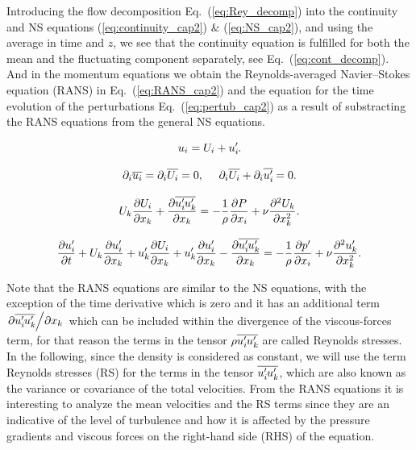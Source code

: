 Introducing the flow decomposition Eq.~(\ref{eq:Rey_decomp}) into the continuity and NS equations (\ref{eq:continuity_cap2}) $\&$ (\ref{eq:NS_cap2}), and using the average in time and $z$, we see that the continuity equation is fulfilled for both the mean and the fluctuating component separately, see Eq.~(\ref{eq:cont_decomp}). And in the momentum equations we obtain the Reynolds-averaged Navier--Stokes equation (RANS) in Eq.~(\ref{eq:RANS_cap2}) and the equation for the time evolution of the perturbations Eq.~(\ref{eq:pertub_cap2}) as a result of substracting the RANS equations from the general NS equations.

\begin{equation}
    \label{eq:Rey_decomp}
    u_i = U_i + u_i^{\prime}\mkern-1.2mu.
\end{equation}

\begin{equation}
    \label{eq:cont_decomp}
    \partial_i \overline{u_i} = \partial_i \overline{U_i} = 0 ,~~~~
    \partial_i \overline{U_i} + \partial_i \overline{u_i^{\prime}\mkern-1.2mu} = 0.  
\end{equation}

\begin{equation}
    \label{eq:RANS_cap2}
    U_k\pdv{U_i}{x_k} + \pdv{\overline{u_i^{\prime}\mkern-1.2muu_k^{\prime}\mkern-1.2mu}}{x_k} = -\frac {1} {\rho} \frac {\partial P}{\partial x_i} + \nu  \frac {\partial^2 U_k} {\partial x_k^2}.
\end{equation}

\begin{equation}
    \label{eq:pertub_cap2}
    {\pdv{u_i^{\prime}\mkern-1.2mu}{t} + 
    U_k\pdv{u_i^{\prime}\mkern-1.2mu}{x_k} + u_k^{\prime}\mkern-1.2mu\pdv{U_i}{x_k} + u_k^{\prime}\mkern-1.2mu\pdv{u_i^{\prime}\mkern-1.2mu}{x_k} - \pdv{\overline{u_i^{\prime}\mkern-1.2muu_k^{\prime}\mkern-1.2mu}}{x_k}  =
    -\frac{1}{\rho} \pdv{p^{\prime}\mkern-1.2mu}{x_i} + \nu  \frac {\partial^2 u_k^{\prime}\mkern-1.2mu} {\partial x_k^2}    }.
\end{equation}

Note that the RANS equations are similar to the NS equations, with the exception of the time derivative which is zero and it has an additional term $\pdv{\overline{u_i^{\prime}\mkern-1.2muu_k^{\prime}\mkern-1.2mu}}/{x_k}$ which can be included within the divergence of the viscous-forces term, for that reason the terms in the tensor $\rho \overline{u_i^{\prime}\mkern-1.2mu u_k^{\prime}\mkern-1.2mu}$ are called Reynolds stresses. In the following, since the density is considered as constant, we will use the term Reynolds stresses (RS) for the terms in the tensor $\overline{u_i^{\prime}\mkern-1.2mu u_k^{\prime}\mkern-1.2mu}$, which are also known as the variance or covariance of the total velocities.
From the RANS equations it is interesting to analyze the mean velocities and the RS terms since they are an indicative of the level of turbulence and how it is affected by the pressure gradients and viscous forces on the right-hand side (RHS) of the equation.

